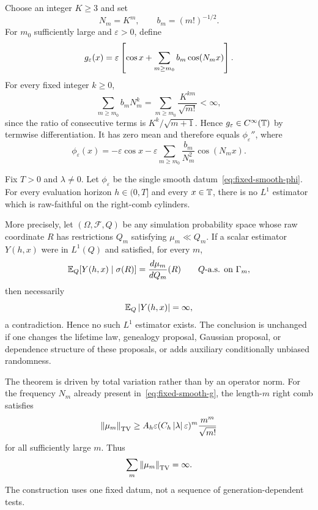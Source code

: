 Choose an integer $K\geq3$ and set
\begin{equation}
  N_m=K^m,
  \qquad
  b_m=(m!)^{-1/2}.
  \label{eq:Nm-bm}
\end{equation}
For $m_0$ sufficiently large and $\varepsilon>0$, define
\begin{equation}
  g_\varepsilon(x)
  =
  \varepsilon\left[
    \cos x+
    \sum_{m\geq m_0}
    b_m\cos(N_mx)
  \right].
  \label{eq:fixed-smooth-g}
\end{equation}
For every fixed integer $k\geq0$,
\begin{equation*}
  \sum_{m\geq m_0}b_mN_m^k
  =
  \sum_{m\geq m_0}
  \frac{K^{km}}{\sqrt{m!}}
  <\infty,
\end{equation*}
since the ratio of consecutive terms is $K^k/\sqrt{m+1}$. Hence $g_\varepsilon\in C^\infty(\mathbb T)$ by termwise differentiation. It has zero mean and therefore equals $\phi_\varepsilon''$, where
\begin{equation}
  \phi_\varepsilon(x)
  =
  -\varepsilon\cos x
  -\varepsilon\sum_{m\geq m_0}
  \frac{b_m}{N_m^2}\cos(N_mx).
  \label{eq:fixed-smooth-phi}
\end{equation}

\begin{theorem}
\label{thm:raw-faithful-obstruction}
Fix $T>0$ and $\lambda\neq0$. Let $\phi_\varepsilon$ be the single smooth datum~\eqref{eq:fixed-smooth-phi}. For every evaluation horizon $h\in(0,T]$ and every $x\in\mathbb T$, there is no $L^1$ estimator which is raw-faithful on the right-comb cylinders.

More precisely, let $(\Omega,\mathcal F,Q)$ be any simulation probability space whose raw coordinate $R$ has restrictions $Q_m$ satisfying $\mu_m\ll Q_m$. If a scalar estimator $Y(h,x)$ were in $L^1(Q)$ and satisfied, for every $m$,
\begin{equation*}
  \mathbb E_Q[Y(h,x)\mid\sigma(R)]
  =
  \frac{d\mu_m}{dQ_m}(R)
  \qquad Q\text{-a.s. on }\Gamma_m,
\end{equation*}
then necessarily
\begin{equation*}
  \mathbb E_Q\left|Y(h,x)\right|=\infty,
\end{equation*}
a contradiction. Hence no such $L^1$ estimator exists.
The conclusion is unchanged if one changes the lifetime law, genealogy proposal, Gaussian proposal, or dependence structure of these proposals, or adds auxiliary conditionally unbiased randomness.
\end{theorem}

The theorem is driven by total variation rather than by an operator norm. For the frequency $N_m$ already present in~\eqref{eq:fixed-smooth-g}, the length-$m$ right comb satisfies
\begin{equation}
  \left\lVert\mu_m\right\rVert_{\mathrm{TV}}
  \geq
  A_h\varepsilon
  (C_h\left|\lambda\right|\varepsilon)^m
  \frac{m^m}{\sqrt{m!}}
  \label{eq:comb-TV-lower}
\end{equation}
for all sufficiently large $m$. Thus
\begin{equation*}
  \sum_m\left\lVert\mu_m\right\rVert_{\mathrm{TV}}=\infty.
\end{equation*}
The construction uses one fixed datum, not a sequence of generation-dependent tests.

